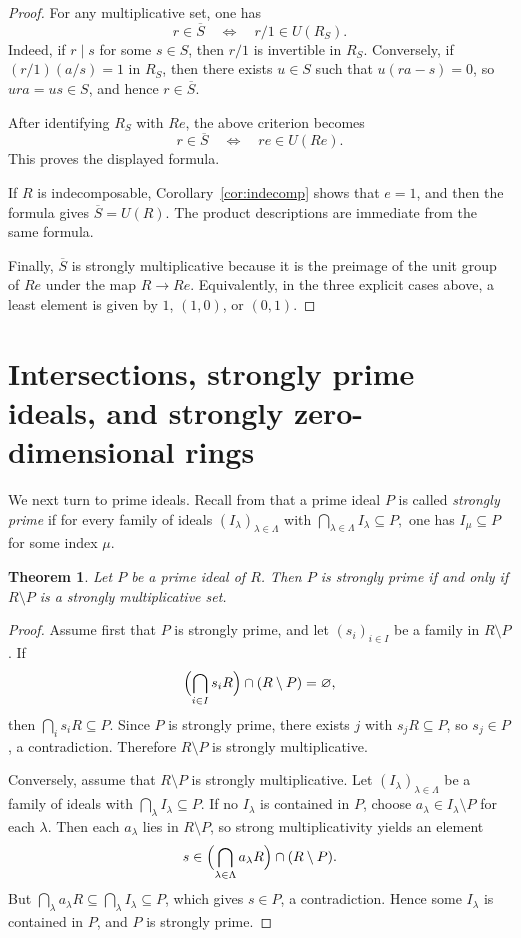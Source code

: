 \documentclass[11pt]{amsart}
\newtheorem{theorem}{Theorem}[section]
\theoremstyle{definition}
\theoremstyle{remark}
\begin{document}
\begin{proof}
For any multiplicative set, one has
\[
r \in \overline S
\quad\Longleftrightarrow\quad
r/1 \in U(R_S).
\]
Indeed, if $r \mid s$ for some $s \in S$, then $r/1$ is invertible in $R_S$.
Conversely, if $(r/1)(a/s)=1$ in $R_S$, then there exists $u \in S$ such that $u(ra-s)=0$, so $ura=us \in S$, and hence $r \in \overline S$.

After identifying $R_S$ with $Re$, the above criterion becomes
\[
r \in \overline S
\quad\Longleftrightarrow\quad
re \in U(Re).
\]
This proves the displayed formula.

If $R$ is indecomposable, Corollary~\ref{cor:indecomp} shows that $e=1$, and then the formula gives $\overline S=U(R)$.
The product descriptions are immediate from the same formula.

Finally, $\overline S$ is strongly multiplicative because it is the preimage of the unit group of $Re$ under the map $R \to Re$.
Equivalently, in the three explicit cases above, a least element is given by $1$, $(1,0)$, or $(0,1)$.
\end{proof}

\section{Intersections, strongly prime ideals, and strongly zero-dimensional rings}

We next turn to prime ideals.
Recall from \cite{Tekir} that a prime ideal $P$ is called \emph{strongly prime} if for every family of ideals $(I_\lambda)_{\lambda \in \Lambda}$ with
$\bigcap_{\lambda \in \Lambda} I_\lambda \subseteq P,$
one has $I_\mu \subseteq P$ for some index $\mu$.

\begin{theorem}\label{thm:strongprime}
Let $P$ be a prime ideal of $R$.
Then $P$ is strongly prime if and only if $R \setminus P$ is a strongly multiplicative set.
\end{theorem}

\begin{proof}
Assume first that $P$ is strongly prime, and let $(s_i)_{i \in I}$ be a family in $R \setminus P$.
If
\[
\Bigl(\bigcap_{i \in I} s_iR\Bigr)\cap (R \setminus P)=\varnothing,
\]
then $\bigcap_i s_iR \subseteq P$.
Since $P$ is strongly prime, there exists $j$ with $s_jR \subseteq P$, so $s_j \in P$, a contradiction.
Therefore $R \setminus P$ is strongly multiplicative.

Conversely, assume that $R \setminus P$ is strongly multiplicative.
Let $(I_\lambda)_{\lambda \in \Lambda}$ be a family of ideals with $\bigcap_\lambda I_\lambda \subseteq P$.
If no $I_\lambda$ is contained in $P$, choose $a_\lambda \in I_\lambda \setminus P$ for each $\lambda$.
Then each $a_\lambda$ lies in $R \setminus P$, so strong multiplicativity yields an element
\[
s \in \Bigl(\bigcap_{\lambda \in \Lambda} a_\lambda R\Bigr)\cap (R \setminus P).
\]
But $\bigcap_\lambda a_\lambda R \subseteq \bigcap_\lambda I_\lambda \subseteq P$, which gives $s \in P$, a contradiction.
Hence some $I_\lambda$ is contained in $P$, and $P$ is strongly prime.
\end{proof}
\end{document}
